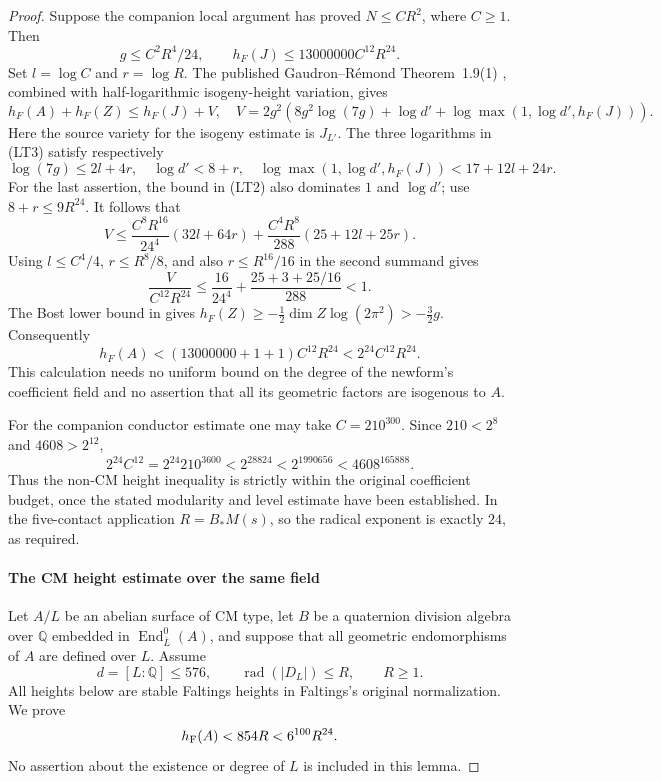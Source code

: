 \begin{proof}
Suppose the companion local argument has proved $N\leq C R^2$,
where $C\geq1$. Then
\[
 g\leq C^2R^4/24,\qquad
 h_F(J)\leq13000000C^{12}R^{24}.
\]
Set $l=\log C$ and $r=\log R$. The published
Gaudron--R\'emond Theorem~1.9(1) \cite[pp.~7--8]{GaudronRemond2023}, combined with half-logarithmic isogeny-height variation,
gives
\[
 h_F(A)+h_F(Z)\leq h_F(J)+V,
 \quad
 V=2g^2\left(8g^2\log(7g)+\log d'
       +\log\max(1,\log d',h_F(J))\right).
\tag{LT3}
\]
Here the source variety for the isogeny estimate is $J_{L'}$.
The three logarithms in (LT3) satisfy respectively
\[
 \log(7g)\leq2l+4r,\quad
 \log d'<8+r,\quad
 \log\max(1,\log d',h_F(J))<17+12l+24r.
\]
For the last assertion, the bound in (LT2) also dominates $1$ and
$\log d'$; use $8+r\leq9R^{24}$.
It follows that
\[
 V\leq
 \frac{C^8R^{16}}{24^4}(32l+64r)
 +\frac{C^4R^8}{288}(25+12l+25r).
\tag{LT4}
\]
Using $l\leq C^4/4$, $r\leq R^8/8$, and also
$r\leq R^{16}/16$ in the second summand gives
\[
 \frac{V}{C^{12}R^{24}}
 \leq\frac{16}{24^4}+\frac{25+3+25/16}{288}<1.
\tag{LT5}
\]
The Bost lower bound in \cite[(2.2), p.~5]{vonKaenel2021}
gives $h_F(Z)\geq-\tfrac12\dim Z\log(2\pi^2)>-\tfrac32g$.
Consequently
\[
 h_F(A)<(13000000+1+1)C^{12}R^{24}
       <2^{24}C^{12}R^{24}.
\tag{LT6}
\]
This calculation needs no uniform bound on the degree of the newform's
coefficient field and no assertion that all its geometric factors are
isogenous to $A$.

For the companion conductor estimate one may take $C=210^{300}$.
Since $210<2^8$ and $4608>2^{12}$,
\[
 2^{24}C^{12}=2^{24}210^{3600}
 <2^{28824}<2^{1990656}<4608^{165888}.
\tag{LT7}
\]
Thus the non-CM height inequality is strictly within the original
coefficient budget, once the stated modularity and level estimate have
been established. In the five-contact application $R=B_*M(s)$, so
the radical exponent is exactly $24$, as required.

\paragraph{The CM height estimate over the same field}
Let $A/L$ be an abelian surface of CM type, let $B$ be a quaternion
division algebra over $\mathbb Q$ embedded in
$\operatorname{End}^0_{\overline L}(A)$, and suppose that all geometric
endomorphisms of $A$ are defined over $L$. Assume
\[
 d=[L:\mathbb Q]\le576,\qquad
 \operatorname{rad}(|D_L|)\le R,\qquad R\ge1.
\]
All heights below are stable Faltings heights in Faltings's original
normalization. We prove
\begin{equation}\label{eq:original-cm-bound}
 h_{\rm F}(A)<854R<6^{100}R^{24}.
\end{equation}
No assertion about the existence or degree of $L$ is included in this lemma.


\end{proof}
